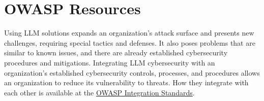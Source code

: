 
\clearpage
\section{OWASP Resources}

Using LLM solutions expands an organization's attack surface and presents new
challenges, requiring special tactics and defenses. It also poses problems that
are similar to known issues, and there are already established cybersecurity
procedures and mitigations. Integrating LLM cybersecurity with an organization's
established cybersecurity controls, processes, and procedures allows an
organization to reduce its vulnerability to threats. How they integrate with
each other is available at the
\href{https://owasp.org/www-project-integration-standards/}{OWASP Integration Standards}.

